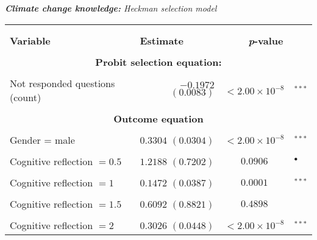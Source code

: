 \documentclass[a4paper,12pt]{article}
\begin{document}
{\centering
\begin{threeparttable}
\caption{\textit{\textbf{Climate change knowledge:} Heckman selection model}}
\label{KnowHeckman1} 
\centering
\begin{small}
\begin{tabular}{lrcl} 
\hline \vspace{-0.3cm} \\
  \vspace{-0.2cm} \\
  \multicolumn{1}{l}{\vspace{0.25cm}\textbf{Variable}} & \multicolumn{1}{l}{\textbf{Estimate}} &  \multicolumn{2}{c}{\textbf{\textit{p}-value}} \\
 \hline 
\hline
 \vspace{-0.25cm} \\
   \multicolumn{4}{c}{\vspace{0.1cm}\textbf{Probit selection equation:}}\\
   \hline
   \\
\vspace{0.1cm}Not responded questions (count)&$-0.1972$ $(0.0083)$ &$<2.00\times 10^{-8}$&$^{***}$ \\
 \hline
  \vspace{-0.25cm} \\
  \multicolumn{4}{c}{\vspace{0.1cm}\textbf{Outcome equation}}\\
   \hline
      \\
      \vspace{-0.2cm}Gender = male&$0.3304$ $(0.0304)$&$<2.00\times 10^{-8}$&$^{***}$\\
  \\
\vspace{-0.2cm}Cognitive reflection $=0.5$&$1.2188$ $(0.7202)$&$0.0906$&$^{\bullet}$\\
  \\
\vspace{-0.2cm}Cognitive reflection $=1$&$0.1472$ $(0.0387)$&$0.0001$&$^{***}$\\
  \\
  \vspace{-0.2cm}Cognitive reflection $=1.5$&$0.6092$ $(0.8821)$&$0.4898$\\
   \\
\vspace{-0.2cm}Cognitive reflection $=2$&$0.3026$ $(0.0448)$&$<2.00\times 10^{-8}$&$^{***}$\\

\end{tabular}
\end{small}
\end{threeparttable}}
\end{document}
